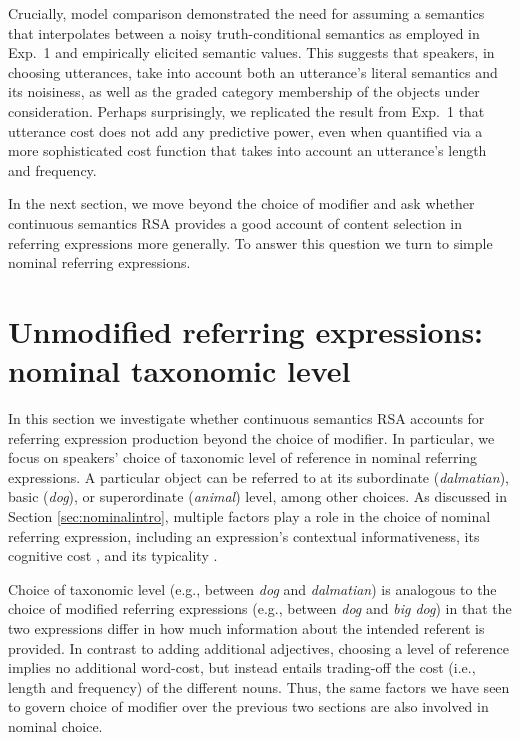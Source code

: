 \documentclass[11pt]{article}
\newcommand{\sectionref}[1]{Section \ref{#1}}
\begin{document}
Crucially, model comparison demonstrated the need for assuming a semantics that interpolates between a noisy truth-conditional semantics as employed in Exp.~1 and empirically elicited semantic values. This suggests that speakers, in choosing utterances, take into account both an utterance's literal semantics and its noisiness, as well as the graded category membership of the objects under consideration. Perhaps surprisingly, we replicated the result from Exp.~1 that utterance cost does not add any predictive power, even when quantified via a more sophisticated cost function that takes into account an utterance's length and frequency.

In the next section, we move beyond the choice of modifier and ask whether continuous semantics RSA provides a good account of content selection in referring expressions more generally. To answer this question we turn to simple nominal referring expressions.

\section{Unmodified referring expressions: nominal taxonomic level}
\label{sec:nominal}

In this section we investigate whether continuous semantics RSA accounts for referring expression production beyond the choice of modifier. In particular, we focus on speakers' choice of taxonomic level of reference in nominal referring expressions. A particular object can be referred to at its subordinate (\emph{dalmatian}), basic (\emph{dog}), or superordinate (\emph{animal}) level, among other choices. As discussed in \sectionref{sec:nominalintro},  multiple factors play a role in the choice of nominal referring expression, including an expression's contextual informativeness, its cognitive cost \cite<short and frequent terms are preferred over long and infrequent ones,>{griffin1998,jescheniak1994}, and its typicality \cite<an utterance is more likely to be used if the object is a good instance of it,> {Jolicoeur1984}.

Choice of taxonomic level (e.g., between \emph{dog} and \emph{dalmatian}) is analogous to the choice of modified referring expressions (e.g., between \emph{dog} and \emph{big dog}) in that the two expressions differ in how much information about the intended referent is provided. In contrast to adding additional adjectives, choosing a level of reference implies no additional word-cost, but instead entails trading-off the cost (i.e., length and frequency) of the different nouns. Thus, the same factors we have seen to govern choice of modifier over the previous two sections are also involved in nominal choice.
\end{document}
